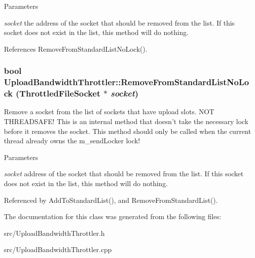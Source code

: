 \begin{DoxyParams}{Parameters}
\item[{\em socket}]the address of the socket that should be removed from the list. If this socket does not exist in the list, this method will do nothing. \end{DoxyParams}


References RemoveFromStandardListNoLock().
\subsubsection[{RemoveFromStandardListNoLock}]{\setlength{\rightskip}{0pt plus 5cm}bool UploadBandwidthThrottler::RemoveFromStandardListNoLock ({\bf ThrottledFileSocket} $\ast$ {\em socket})\hspace{0.3cm}{\ttfamily  [private]}}\label{classUploadBandwidthThrottler_afc05f9903b53dbf9f777213b7f8e0e28}


Remove a socket from the list of sockets that have upload slots. NOT THREADSAFE! This is an internal method that doesn't take the necessary lock before it removes the socket. This method should only be called when the current thread already owns the m\_\-sendLocker lock!


\begin{DoxyParams}{Parameters}
\item[{\em socket}]address of the socket that should be removed from the list. If this socket does not exist in the list, this method will do nothing. \end{DoxyParams}


Referenced by AddToStandardList(), and RemoveFromStandardList().

The documentation for this class was generated from the following files:\begin{DoxyCompactItemize}
\item 
src/UploadBandwidthThrottler.h\item 
src/UploadBandwidthThrottler.cpp\end{DoxyCompactItemize}
